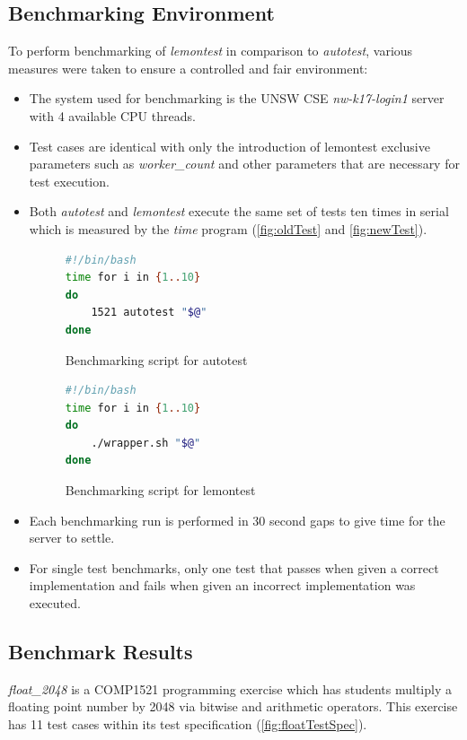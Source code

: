 \documentclass[hidelinks]{report}
\begin{document}
\subsection{Benchmarking Environment}
To perform benchmarking of \textit{lemontest} in comparison to \textit{autotest}, various measures were taken to ensure a controlled and fair environment:
\begin{itemize}
	\item The system used for benchmarking is the UNSW CSE \textit{nw-k17-login1} server with 4 available CPU threads.
	\item Test cases are identical with only the introduction of lemontest exclusive parameters such as \textit{worker\_count} and other parameters that are necessary for test execution.
	\item Both \textit{autotest} and \textit{lemontest} execute the same set of tests ten times in serial which is measured by the \textit{time} program (\autoref{fig:oldTest} and \autoref{fig:newTest}).
	\begin{figure}[h]
		\centering
		\begin{lstlisting}[language=bash, breaklines=true, linewidth=\linewidth, tabsize=4]
#!/bin/bash
time for i in {1..10}
do
    1521 autotest "$@"
done
		\end{lstlisting}
		\caption{Benchmarking script for autotest}
		\label{fig:oldTest}
	\end{figure}
	\begin{figure}[h]
		\centering
		\begin{lstlisting}[language=bash, breaklines=true, linewidth=\linewidth, tabsize=4]
#!/bin/bash
time for i in {1..10}
do
    ./wrapper.sh "$@"
done
		\end{lstlisting}
		\caption{Benchmarking script for lemontest}
		\label{fig:newTest}
	\end{figure}
	\item Each benchmarking run is performed in 30 second gaps to give time for the server to settle.
	\item For single test benchmarks, only one test that passes when given a correct implementation and fails when given an incorrect implementation was executed.
\end{itemize}

\subsection{Benchmark Results}
\textit{float\_2048} is a COMP1521 programming exercise which has students multiply a floating point number by 2048 via bitwise and arithmetic operators. This exercise has 11 test cases within its test specification (\autoref{fig:floatTestSpec}).
\end{document}
